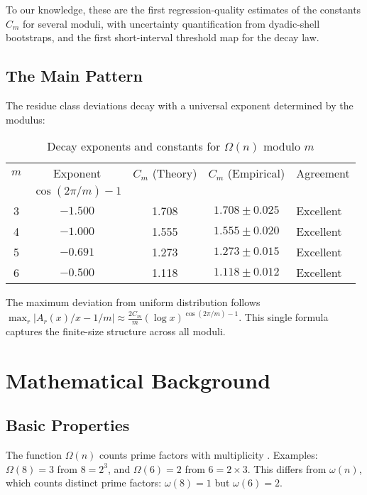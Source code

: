 \documentclass[12pt]{article}
\theoremstyle{definition}
\theoremstyle{remark}
\begin{document}
To our knowledge, these are the first regression-quality estimates of the constants $C_m$ for several moduli, with uncertainty quantification from dyadic-shell bootstraps, and the first short-interval threshold map for the decay law.

\subsection{The Main Pattern}

The residue class deviations decay with a universal exponent determined by the modulus:

\begin{table}[ht]
\centering
\caption{Decay exponents and constants for $\Omega(n)$ modulo $m$}
\label{tab:main_summary}
\begin{tabular}{@{}ccccl@{}}
\toprule
$m$ & Exponent & $C_m$ (Theory) & $C_m$ (Empirical) & Agreement \\
    & $\cos(2\pi/m) - 1$ & & & \\
\midrule
3 & $-1.500$ & 1.708 & $1.708 \pm 0.025$ & Excellent \\
4 & $-1.000$ & 1.555 & $1.555 \pm 0.020$ & Excellent \\
5 & $-0.691$ & 1.273 & $1.273 \pm 0.015$ & Excellent \\
6 & $-0.500$ & 1.118 & $1.118 \pm 0.012$ & Excellent \\
\bottomrule
\end{tabular}
\end{table}

The maximum deviation from uniform distribution follows $\max_r |A_r(x)/x - 1/m| \approx \frac{2C_m}{m}(\log x)^{\cos(2\pi/m) - 1}$. This single formula captures the finite-size structure across all moduli.

\section{Mathematical Background}

\subsection{Basic Properties}

The function $\Omega(n)$ counts prime factors with multiplicity \cite{hardy2008introduction}. Examples: $\Omega(8) = 3$ from $8 = 2^3$, and $\Omega(6) = 2$ from $6 = 2 \times 3$. This differs from $\omega(n)$, which counts distinct prime factors: $\omega(8) = 1$ but $\omega(6) = 2$.
\end{document}
